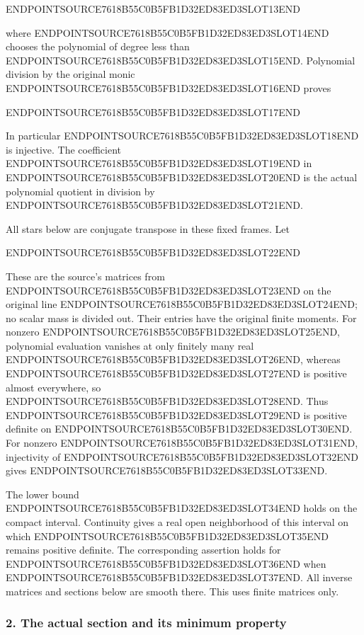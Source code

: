 ENDPOINTSOURCE7618B55C0B5FB1D32ED83ED3SLOT13END

where ENDPOINTSOURCE7618B55C0B5FB1D32ED83ED3SLOT14END chooses the polynomial of degree less than ENDPOINTSOURCE7618B55C0B5FB1D32ED83ED3SLOT15END. Polynomial division by the original monic ENDPOINTSOURCE7618B55C0B5FB1D32ED83ED3SLOT16END proves

ENDPOINTSOURCE7618B55C0B5FB1D32ED83ED3SLOT17END

In particular ENDPOINTSOURCE7618B55C0B5FB1D32ED83ED3SLOT18END is injective. The coefficient ENDPOINTSOURCE7618B55C0B5FB1D32ED83ED3SLOT19END in ENDPOINTSOURCE7618B55C0B5FB1D32ED83ED3SLOT20END is the actual polynomial quotient in division by ENDPOINTSOURCE7618B55C0B5FB1D32ED83ED3SLOT21END.

All stars below are conjugate transpose in these fixed frames. Let

ENDPOINTSOURCE7618B55C0B5FB1D32ED83ED3SLOT22END

These are the source's matrices from ENDPOINTSOURCE7618B55C0B5FB1D32ED83ED3SLOT23END on the original line ENDPOINTSOURCE7618B55C0B5FB1D32ED83ED3SLOT24END; no scalar mass is divided out. Their entries have the original finite moments. For nonzero ENDPOINTSOURCE7618B55C0B5FB1D32ED83ED3SLOT25END, polynomial evaluation vanishes at only finitely many real ENDPOINTSOURCE7618B55C0B5FB1D32ED83ED3SLOT26END, whereas ENDPOINTSOURCE7618B55C0B5FB1D32ED83ED3SLOT27END is positive almost everywhere, so ENDPOINTSOURCE7618B55C0B5FB1D32ED83ED3SLOT28END. Thus ENDPOINTSOURCE7618B55C0B5FB1D32ED83ED3SLOT29END is positive definite on ENDPOINTSOURCE7618B55C0B5FB1D32ED83ED3SLOT30END. For nonzero ENDPOINTSOURCE7618B55C0B5FB1D32ED83ED3SLOT31END, injectivity of ENDPOINTSOURCE7618B55C0B5FB1D32ED83ED3SLOT32END gives ENDPOINTSOURCE7618B55C0B5FB1D32ED83ED3SLOT33END.

The lower bound ENDPOINTSOURCE7618B55C0B5FB1D32ED83ED3SLOT34END holds on the compact interval. Continuity gives a real open neighborhood of this interval on which ENDPOINTSOURCE7618B55C0B5FB1D32ED83ED3SLOT35END remains positive definite. The corresponding assertion holds for ENDPOINTSOURCE7618B55C0B5FB1D32ED83ED3SLOT36END when ENDPOINTSOURCE7618B55C0B5FB1D32ED83ED3SLOT37END. All inverse matrices and sections below are smooth there. This uses finite matrices only.

\subsubsection{2. The actual section and its minimum property}\label{endpoint-variation_review--the-actual-section-and-its-minimum-property}

